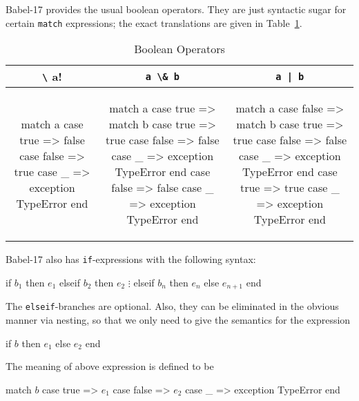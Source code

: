 \documentclass[11pt]{amsart}
\newcommand{\babelsrc}[1] {\lstinline!#1!}
\begin{document}
Babel-17 provides the usual boolean operators. They are just syntactic sugar for certain \babelsrc{match} expressions; the exact translations are given in Table~\ref{tab:booleanops}.
\begin{table}
\caption{Boolean Operators}
\begin{tabular}{c|c|c}
\babelsrc{\! a} & \babelsrc{a \& b} &\babelsrc{a | b} \\\hline
 \small
\begin{babellisting}
match a 
  case true => 
    false 
  case false => 
    true
  case _ => 
    exception TypeError
end
\end{babellisting}
 & 
 \small
\begin{babellisting}
match a 
  case true => 
    match b 
      case true => 
        true
      case false => 
        false
      case _ => 
        exception TypeError
    end 
  case false => 
    false
  case _ => 
    exception TypeError
end
\end{babellisting}
 & 
 \small
\begin{babellisting}
match a 
  case false => 
    match b 
      case true => 
        true
      case false => 
        false
      case _ => 
        exception TypeError
    end 
  case true => 
    true
  case _ => 
    exception TypeError
end
\end{babellisting}
\end{tabular}
\label{tab:booleanops}
\end{table}
Babel-17 also has \babelsrc{if}-expressions with the following syntax:
\begin{babellisting}
if $b_1$ then
  $e_1$
elseif $b_2$ then
  $e_2$
  $\vdots$
elseif $b_n$ then
  $e_n$
else
  $e_{n+1}$
end
\end{babellisting}
The \babelsrc{elseif}-branches are  optional. Also, they can be eliminated in the obvious manner via nesting, so that we only need to give the semantics for the expression
\begin{babellisting}
if $b$ then $e_1$ else $e_2$ end
\end{babellisting}
The meaning of above expression is defined to be
\begin{babellisting}
match $b$ 
  case true => $e_1$
  case false => $e_2$
  case _ => exception TypeError 
end
\end{babellisting}
\end{document}
